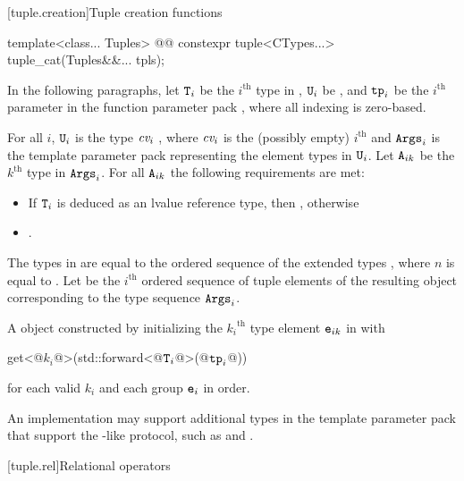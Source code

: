 \documentclass{wg21}
\begin{document}
[tuple.creation]{Tuple creation functions}


\begin{itemdecl}
template<class... Tuples>
@@
constexpr tuple<CTypes...> tuple_cat(Tuples&&... tpls);
\end{itemdecl}

\begin{itemdescr}
\pnum
In the following paragraphs, let $\texttt{T}_i$ be the $i^\text{th}$ type in ,
$\texttt{U}_i$ be , and $\texttt{tp}_i$ be the $i^\text{th}$
parameter in the function parameter pack , where all indexing is
zero-based.

\pnum
\expects
For all $i$, $\texttt{U}_i$ is the type
$\textit{cv}_i$ , where $\textit{cv}_i$ is the (possibly empty) $i^\text{th}$
 and $\texttt{Args}_i$ is the template parameter pack representing the element
types in $\texttt{U}_i$. Let $\texttt{A}_{ik}$ be the ${k}^\text{th}$ type in $\texttt{Args}_i$. For all
$\texttt{A}_{ik}$ the following requirements are met:


\begin{itemize}
    \item If $\texttt{T}_i$ is deduced as an lvalue reference type, then
    , otherwise
    \item {}.
\end{itemize}

\pnum
\remarks
The types in  are equal to the ordered
sequence of the extended types
,
where $n$ is
equal to . Let  be the $i^\text{th}$
ordered sequence of tuple elements of the resulting  object
corresponding to the type sequence $\texttt{Args}_i$.

\pnum
\returns
A  object constructed by initializing the ${k_i}^\text{th}$
type element $\texttt{e}_{ik}$ in  with
\begin{codeblock}
    get<@$k_i$@>(std::forward<@$\texttt{T}_i$@>(@$\texttt{tp}_i$@))
\end{codeblock}
for each valid $k_i$ and each group $\texttt{e}_i$ in order.

\pnum
\begin{removedblock}
\begin{note}
    An implementation may support additional types in the template parameter
    pack  that support the -like protocol, such as
     and .
\end{note}
\end{removedblock}

\end{itemdescr}
[tuple.rel]{Relational operators}
\end{document}
